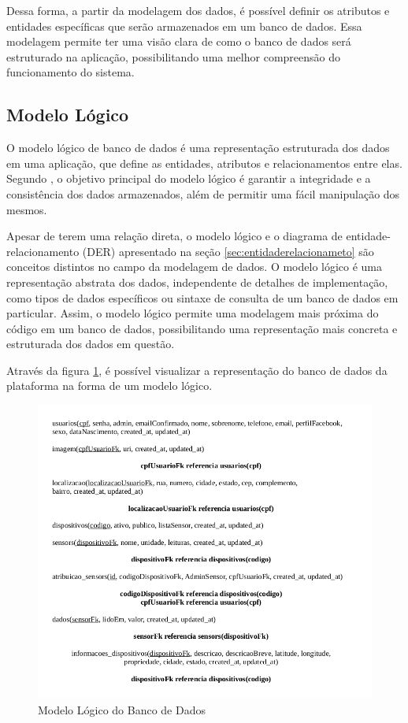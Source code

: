 \documentclass[tcc,capa]{texufpel}
\begin{document}
Dessa forma, a partir da modelagem dos dados, é possível definir os atributos e entidades específicas que serão armazenados em um banco de dados. Essa modelagem permite ter uma visão clara de como o banco de dados será estruturado na aplicação, possibilitando uma melhor compreensão do funcionamento do sistema.

\subsection{Modelo Lógico}
O modelo lógico de banco de dados é uma representação estruturada dos dados em uma aplicação, que define as entidades, atributos e relacionamentos entre elas. Segundo \citet{Silberschatz:2010}, o objetivo principal do modelo lógico é garantir a integridade e a consistência dos dados armazenados, além de permitir uma fácil manipulação dos mesmos.

Apesar de terem uma relação direta, o modelo lógico e o diagrama de entidade-relacionamento (DER) apresentado na seção \ref{sec:entidaderelacionameto} são conceitos distintos no campo da modelagem de dados. O modelo lógico é uma representação abstrata dos dados, independente de detalhes de implementação, como tipos de dados específicos ou sintaxe de consulta de um banco de dados em particular. Assim, o modelo lógico permite uma modelagem mais próxima do código em um banco de dados, possibilitando uma representação mais concreta e estruturada dos dados em questão.

Através da figura \ref{modelologico}, é possível visualizar a representação do banco de dados da plataforma na forma de um modelo lógico.
\begin{figure}[htbp]
  \centering \includegraphics[scale=.4]{assets/modelo_logico.png}
  \caption{Modelo Lógico do Banco de Dados}
  \label{modelologico}
\end{figure}
\end{document}
